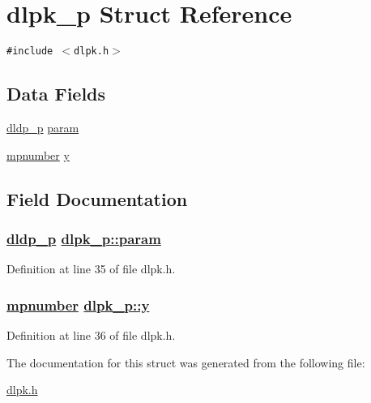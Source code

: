 \hypertarget{structdlpk__p}{
\section{dlpk\_\-p Struct Reference}
\label{structdlpk__p}
}
{\tt \#include $<$dlpk.h$>$}

\subsection*{Data Fields}
\begin{CompactItemize}
\item 
\hyperlink{structdldp__p}{dldp\_\-p} \hyperlink{structdlpk__p_o0}{param}
\item 
\hyperlink{structmpnumber}{mpnumber} \hyperlink{structdlpk__p_o1}{y}
\end{CompactItemize}


\subsection{Field Documentation}
\hypertarget{structdlpk__p_o0}{
\subsubsection[param]{\setlength{\rightskip}{0pt plus 5cm}\hyperlink{structdldp__p}{dldp\_\-p} \hyperlink{structdlpk__p_o0}{dlpk\_\-p::param}}}
\label{structdlpk__p_o0}


Definition at line 35 of file dlpk.h.\hypertarget{structdlpk__p_o1}{
\subsubsection[y]{\setlength{\rightskip}{0pt plus 5cm}\hyperlink{structmpnumber}{mpnumber} \hyperlink{structdlpk__p_o1}{dlpk\_\-p::y}}}
\label{structdlpk__p_o1}


Definition at line 36 of file dlpk.h.

The documentation for this struct was generated from the following file:\begin{CompactItemize}
\item 
\hyperlink{dlpk_8h}{dlpk.h}\end{CompactItemize}

